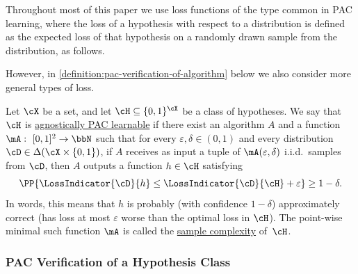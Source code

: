 \documentclass{toc}
\begin{document}
Throughout most of this paper we use loss functions of the type common in PAC learning, where the loss of a hypothesis with respect to a distribution is defined as the expected loss of that hypothesis on a randomly drawn sample from the distribution, as follows.


However, in \cref{definition:pac-verification-of-algorithm} below we also consider more general types of loss. 

\begin{definition}
	Let $\cX$ be a set, and let $\cH \subseteq \{0,1\}^\cX$ be a class of hypotheses. We say that $\cH$ is \ul{agnostically PAC learnable} if there exist an algorithm $A$ and a function $\mA:~[0,1]^2 \rightarrow \bbN$ such that for every $\varepsilon,\delta \in (0,1)$ and every distribution ${\cD \in \Delta(\cX \times \{0,1\})}$, if $A$ receives as input a tuple of $\mA(\varepsilon,\delta)$ i.i.d.\ samples from $\cD$, then $A$ outputs a function $h \in \cH$ satisfying
	\[
	\PP{\LossIndicator{\cD}{h} \leq \LossIndicator{\cD}{\cH} + \varepsilon} \geq 1-\delta.
	\]
	In words, this means that $h$ is probably (with confidence $1-\delta$) approximately correct (has loss at most $\varepsilon$ worse than the optimal loss in $\cH$). The point-wise minimal such function $\mA$ is called the \ul{sample complexity} of~$\cH$.
\end{definition}

\subsubsection*{PAC Verification of a Hypothesis Class}
\end{document}
